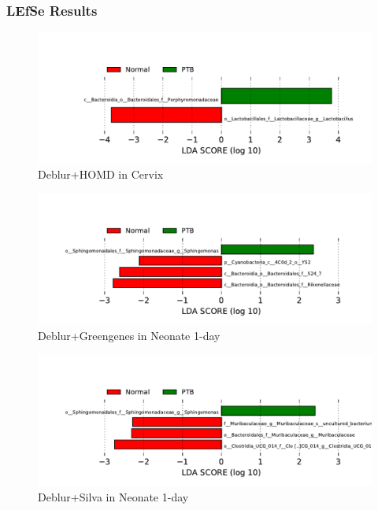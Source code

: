 \documentclass{beamer}
\begin{document}
    \begin{frame}[allowframebreaks]
        \frametitle{LEfSe Results}

        \begin{figure}
            \includegraphics[width=\linewidth]{figures/LEfSe/Default/everything.Deblur.homd.Cervix.pdf}
            \caption{Deblur+HOMD in Cervix}
        \end{figure}

        \begin{figure}
            \includegraphics[width=\linewidth]{figures/LEfSe/Default/everything.Deblur.gg.Neonate-1day.pdf}
            \caption{Deblur+Greengenes in Neonate 1-day}
        \end{figure}

        \begin{figure}
            \includegraphics[width=\linewidth]{figures/LEfSe/Default/everything.Deblur.silva.Neonate-1day.pdf}
            \caption{Deblur+Silva in Neonate 1-day}
        \end{figure}


\end{frame}
\end{document}
